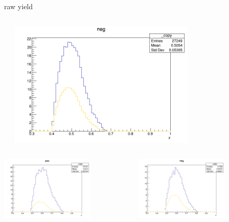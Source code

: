 \begin{frame}{raw yield}
\begin{columns}
\begin{column}[T]{0.25\textwidth}
\end{column}
\begin{column}[T]{0.25\textwidth}
\includegraphics[width = 0.7\textwidth]{results/yield/statistics/yield_x_Q2_z_0.50_3.979_0.50_neg.png}
\end{column}
\end{columns}
\begin{columns}
\begin{column}[T]{0.25\textwidth}
\includegraphics[width = 0.7\textwidth]{results/yield/statistics/yield_x_Q2_z_0.50_3.979_0.60_pos.png}
\end{column}
\begin{column}[T]{0.25\textwidth}
\includegraphics[width = 0.7\textwidth]{results/yield/statistics/yield_x_Q2_z_0.50_3.979_0.60_neg.png}

\end{column}
\end{columns}
\end{frame}
